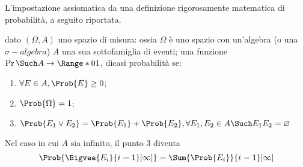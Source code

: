 \documentclass{subfiles}
\begin{document}
L'impostazione assiomatica da una definizione rigorosamente matematica di probabilità, a seguito riportata.
\begin{Definition*}
    dato $(\Omega, A)$ uno spazio di misura: ossia $\Omega$ è uno spazio con un'algebra (o una $\sigma-algebra$)   $A$ una sua sottofamiglia di eventi;
    una funzione $\Pr \Such A \to \Range*{0}{1}$, dicasi probabilità se:
    \begin{enumerate}
        \item $\forall E \in A, \Prob{E} \ge 0$;
        \item $\Prob{\Omega} = 1$;
        \item $\Prob{E_{1} \lor E_{2}} = \Prob{E_{1}} + \Prob{E_{2}}, \forall E_{1}, E_{2} \in A \Such E_{1}E_{2} = \varnothing$
    \end{enumerate}
    Nel caso in cui $A$ sia infinito, il punto 3 diventa
    $$
        \Prob{\Bigvee{E_{i}}{i = 1}[\infty]} = \Sum{\Prob{E_{i}}}{i = 1}[\infty]
    $$
\end{Definition*}
\end{document}
